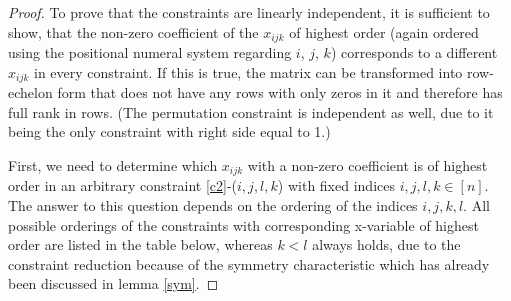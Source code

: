 \documentclass{scrartcl}
\theoremstyle{plain}
\begin{document}
\begin{proof}
	To prove that the constraints are linearly independent, it is sufficient to show, that the non-zero coefficient of the $x_{ijk}$ of highest order (again ordered using the positional numeral system regarding $i$, $j$, $k$) corresponds to a different $x_{ijk}$ in every constraint. If this is true, the matrix can be transformed into row-echelon form that does not have any rows with only zeros in it and therefore has full rank in rows. (The permutation constraint is independent as well, due to it being the only constraint with right side equal to 1.)
	
	First, we need to determine which $x_{ijk}$ with a non-zero coefficient is of highest order in an arbitrary constraint \eqref{c2}-($i,j,l,k$) with fixed indices $i,j,l,k \in [n]$. The answer to this question depends on the ordering of the indices $i,j,k,l$. All possible orderings of the constraints with corresponding x-variable of highest order are listed in the table below, whereas $k<l$ always holds, due to the constraint reduction because of the symmetry characteristic which has already been discussed in lemma \ref{sym}.
	

\end{proof}
\end{document}
